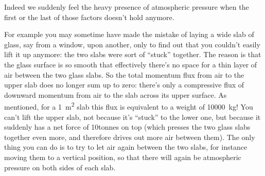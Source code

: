 \documentclass[a4paper,12pt,%
onecolumn,oneside,titlepage,%
british%
]{memoir}
\renewcommand*{\|}[1][]{\nonscript\:#1\vert\nonscript\:\mathopen{}}
\begin{document}
Indeed we suddenly feel the heavy presence of atmospheric pressure when the first or the last of those factors doesn't hold anymore.

For example you may sometime have made the mistake of laying a wide slab of glass, say from a window, upon another, only to find out that you couldn't easily lift it up anymore: the two slabs were sort of \enquote{stuck} together.
%
%
The reason is that the glass surface is so smooth that effectively there's no space for a thin layer of air between the two glass slabs. So the total momentum flux from air to the upper slab does no longer sum up to zero: there's only a compressive flux of downward momentum from air to the slab across its upper surface. As mentioned, for a \qty{1}{m^2} slab this flux is equivalent to a weight of \qty{10000}{kg}! You can't lift the upper slab, not because it's \enquote{stuck} to the lower one, but because it suddenly has a net force of 10\:tonnes on top (which presses the two glass slabs together even more, and therefore drives out more air between them). The only thing you can do is to try to let air again between the two slabs, for instance moving them to a vertical position, so that there will again be atmospheric pressure on both sides of each slab.
\end{document}
